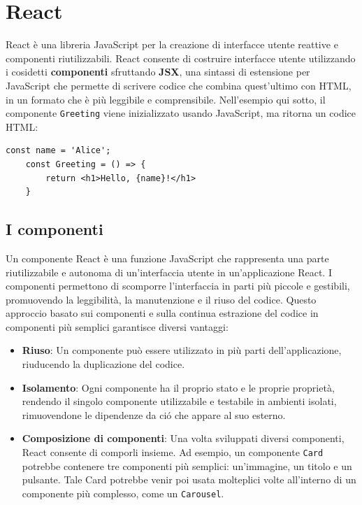 \documentclass[target=bach,aauheader=,style=]{thud}
\begin{document}
\section{React}
React è una libreria JavaScript per la creazione di interfacce utente reattive e componenti riutilizzabili. React consente di costruire interfacce utente utilizzando i cosidetti \textbf{componenti} sfruttando \textbf{JSX}, una sintassi di estensione per JavaScript che permette di scrivere codice che combina quest'ultimo con HTML, in un formato che è più leggibile e comprensibile. Nell'esempio qui sotto,  il componente \texttt{Greeting} viene inizializzato usando JavaScript, ma ritorna un codice HTML:

\begin{lstlisting}[language=React, caption=Esempio di codice React]
    const name = 'Alice';   
    const Greeting = () => {
        return <h1>Hello, {name}!</h1>
    } 
\end{lstlisting}

\subsection{I componenti}
Un componente React è una funzione JavaScript che rappresenta una parte riutilizzabile e autonoma di un'interfaccia utente in un'applicazione React. I componenti permettono di scomporre l'interfaccia in parti più piccole e gestibili, promuovendo la leggibilità, la manutenzione e il riuso del codice. Questo approccio basato sui componenti e sulla continua estrazione del codice in componenti più semplici garantisce diversi vantaggi:

\begin{itemize}
    \item \textbf{Riuso}: Un componente può essere utilizzato in più parti dell'applicazione, riuducendo la duplicazione del codice.
    \item \textbf{Isolamento}: Ogni componente ha il proprio stato e le proprie proprietà, rendendo il singolo componente utilizzabile e testabile in ambienti isolati, rimuovendone le dipendenze da ció che appare al suo esterno.
    \item \textbf{Composizione di componenti}: Una volta sviluppati diversi componenti, React consente di comporli insieme. Ad esempio, un componente \texttt{Card} potrebbe contenere tre componenti più semplici: un'immagine, un titolo e un pulsante. Tale Card potrebbe venir poi usata molteplici volte all'interno di un componente più complesso, come un \texttt{Carousel}.
\end{itemize}
\end{document}

